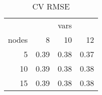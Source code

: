 \begin{table}

\caption{\label{tab:}CV RMSE}
\centering
\begin{tabular}[t]{r|r|r|r}
\hline
\multicolumn{1}{c|}{ } & \multicolumn{3}{c}{vars} \\
\cline{2-4}
nodes & 8 & 10 & 12\\
\hline
5 & 0.39 & 0.38 & 0.37\\
\hline
10 & 0.39 & 0.38 & 0.38\\
\hline
15 & 0.39 & 0.38 & 0.38\\
\hline
\end{tabular}
\end{table}